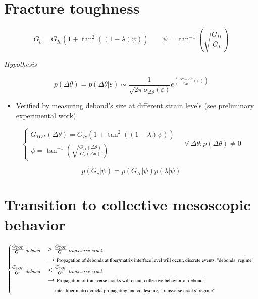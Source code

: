 \documentclass[review]{elsarticle}
\begin{document}
\section{Fracture toughness}

\begin{equation}
G_{c}=G_{Ic}\left(1+\tan^{2}{\left(\left(1-\lambda\right)\psi\right)}\right)\qquad\psi=\tan^{-1}\left(\sqrt{\frac{G_{II}}{G_{I}}}\right)
\end{equation}

\em{Hypothesis}

\begin{equation}
p\left(\Delta\theta\right)=p\left(\Delta\theta|\varepsilon\right)\sim\frac{1}{\sqrt{2\pi}\sigma_{\Delta\theta}\left(\varepsilon\right)}e^{\left(\frac{\Delta\theta-\overline{\Delta\theta}}{\sigma_{\Delta\theta}}\left(\varepsilon\right)\right)}
\end{equation}

\begin{itemize}[$\rightarrow$]
\item Verified by measuring debond's size at different strain levels (see preliminary experimental work)\\
\end{itemize}

\begin{equation}
\begin{cases}
G_{TOT}\left(\Delta\theta\right)=G_{Ic}\left(1+\tan^{2}{\left(\left(1-\lambda\right)\psi\right)}\right)\\
\psi=\tan^{-1}\left(\sqrt{\frac{G_{II}\left(\Delta\theta\right)}{G_{I}\left(\Delta\theta\right)}}\right)
\end{cases}\quad\forall\ \Delta\theta : p(\Delta\theta)\neq 0
\end{equation}

\begin{equation}
p\left(G_{c}|\psi\right)=p\left(G_{Ic}|\psi\right)p\left(\lambda|\psi\right)
\end{equation}

\section{Transition to collective mesoscopic behavior}

\begin{equation}
\begin{cases}
\frac{G_{TOT}}{G_{0}}|_{debond}&>\frac{G_{TOT}}{G_{0}}|_{transverse\ crack}\\ &\rightarrow\text{\scriptsize Propagation of debonds at fiber/matrix interface level will occur, discrete events, "debonds' regime"}\\
\frac{G_{TOT}}{G_{0}}|_{debond}&<\frac{G_{TOT}}{G_{0}}|_{transverse\ crack}\\ &\rightarrow\text{\scriptsize Propagation of transverse cracks will occur, collective behavior of debonds}\\
&\quad\text{\scriptsize inter-fiber matrix cracks propagating and coalescing, "transverse cracks' regime"}\\
\end{cases}
\end{equation}
\end{document}

